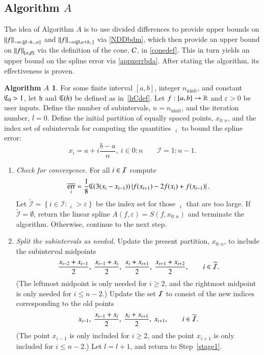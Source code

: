 \documentclass[review]{elsarticle}
\newcommand{\abstol}{\varepsilon}
\newcommand{\zton}{0\!:\!n}
\theoremstyle{definition}
\newtheorem*{algoA}{Algorithm $A$}
\DeclareMathOperator{\ninit}{ninit}
\DeclareMathOperator{\oerr}{\overline{err}}
\begin{document}
\subsection{Algorithm $A$} \label{subsec:appxalgo}

The idea of Algorithm $A$ is to use divided differences to provide upper bounds
on $\norm[-\infty,{[\beta - h_-, \alpha]}]{f}$ and $\norm[-\infty{[\beta,
\alpha+h_+]}]{f}$ via \eqref{NDDbdm}, which then provide an upper bound on
$\norm[{[\alpha,\beta]}]{f}$ via the definition of the cone, $\cc$, in
\eqref{conedef}. This in turn yields an upper bound on the spline error via
\eqref{appxerrbda}. After stating the algorithm, its effectiveness is proven.

\begin{algoA} \label{AlgoA}
For some finite interval $[a,b]$, integer $n_{\ninit}$, and constant $\fC_0 >
1$, let $\fh$ and $\fC(h)$ be defined as in~\eqref{hCdef}. Let $f:[a,b] \to
\reals$ and $\abstol >0$ be user inputs. Define the number of subintervals,
$n=n_{\ninit}$, and the iteration number, $l = 0$. Define the initial partition
of equally spaced points, $x_{0:n}$, and the index set of subintervals for
computing the quantities $\oerr_i$ to bound the spline error:
\[
x_i=a+ i\frac{b-a}{n}, \ i \in \zton \qquad \mathcal{I} = 1\!:\!n-1.
\]

\begin{enumerate}[\em Step 1.]

\item \label{stage1} \emph{Check for convergence.} For all $i \in \ci$ compute
\begin{equation} \label{oerrdef}
\oerr_i = \frac{1}{8} \fC(3(x_i - x_{i-1}))\abs{f(x_{i+1}) - 2f(x_i) + f(x_{i-1})}.
\end{equation}
Let $\widetilde{\mathcal{I}} = \left\{i \in \mathcal{I}: \oerr_i  > \abstol \right\}$ 
be the index set for those $\oerr_i $ that are too large.   If $\widetilde{\mathcal{I}} =
\emptyset$, return the linear spline $A(f,\abstol) = S(f, x_{0:n})$ and terminate
the algorithm. Otherwise, continue to the next step.

\item \label{stage2} \emph{Split the subintervals as needed.} 
Update the present partition, $x_{0:n}$, to include the subinterval midpoints
\[
  \frac{x_{i-2} +x_{i-1}}{2}, \ \frac{x_{i-1} +x_{i}}{2}, 
\ \frac{x_{i} +x_{i+1}}{2}, \  \frac{x_{i+1} +x_{i+2}}{2}, \qquad i \in \widetilde{\ci}.
\] 
(The leftmost midpoint is only needed for $i \ge 2$, and the rightmost midpoint
is only needed for $i \le n-2$.) Update the set $\ci$ to consist of the new
indices corresponding to the old points
\[
x_{i-1}, \ \frac{x_{i-1} +x_{i}}{2}, \ \frac{x_{i} +x_{i+1}}{2}, \  x_{i+1}, 
\qquad i \in \widetilde{\ci}.
\] 
(The point $x_{i-1}$ is only included for $ i \ge 2$, and the point $x_{i+1}$ is
only included for $i \le n-2$.) Let $l = l+1$, and return to Step~\ref{stage1}.
\end{enumerate}
\end{algoA}
\end{document}
